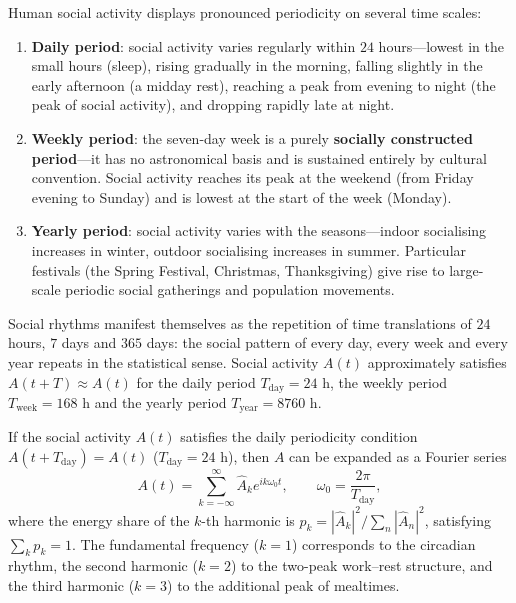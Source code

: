\begin{definition}\label{def:social_rhythms}
Human social activity displays pronounced periodicity on several time scales:
\begin{enumerate}[label=(\roman*)]
    \item \textbf{Daily period}: social activity varies regularly within $24$ hours---lowest in the small hours (sleep), rising gradually in the morning, falling slightly in the early afternoon (a midday rest), reaching a peak from evening to night (the peak of social activity), and dropping rapidly late at night.
    \item \textbf{Weekly period}: the seven-day week is a purely \textbf{socially constructed period}---it has no astronomical basis and is sustained entirely by cultural convention. Social activity reaches its peak at the weekend (from Friday evening to Sunday) and is lowest at the start of the week (Monday).
    \item \textbf{Yearly period}: social activity varies with the seasons---indoor socialising increases in winter, outdoor socialising increases in summer. Particular festivals (the Spring Festival, Christmas, Thanksgiving) give rise to large-scale periodic social gatherings and population movements.
\end{enumerate}
Social rhythms manifest themselves as the repetition of time translations of $24$ hours, $7$ days and $365$ days: the social pattern of every day, every week and every year repeats in the statistical sense. Social activity $A(t)$ approximately satisfies $A(t+T) \approx A(t)$ for the daily period $T_{\text{day}}=24$ h, the weekly period $T_{\text{week}}=168$ h and the yearly period $T_{\text{year}}=8760$ h.
\end{definition}

\begin{proposition}\label{ch27_rhythm_fourier}
If the social activity $A(t)$ satisfies the daily periodicity condition $A(t+T_{\text{day}})=A(t)$ ($T_{\text{day}}=24$ h), then $A$ can be expanded as a Fourier series
\[
A(t) = \sum_{k=-\infty}^{\infty} \hat{A}_k e^{i k \omega_0 t}, \qquad \omega_0 = \frac{2\pi}{T_{\text{day}}},
\]
where the energy share of the $k$-th harmonic is $p_k = |\hat{A}_k|^2 / \sum_{n} |\hat{A}_n|^2$, satisfying $\sum_k p_k = 1$. The fundamental frequency ($k=1$) corresponds to the circadian rhythm, the second harmonic ($k=2$) to the two-peak work--rest structure, and the third harmonic ($k=3$) to the additional peak of mealtimes.
\end{proposition}


